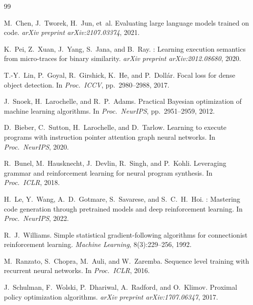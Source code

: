 \documentclass{article}
\begin{document}

\begin{thebibliography}{99}

M.~Chen, J.~Tworek, H.~Jun, et~al.
\newblock Evaluating large language models trained on code.
\newblock \emph{arXiv preprint arXiv:2107.03374}, 2021.

K.~Pei, Z.~Xuan, J.~Yang, S.~Jana, and B.~Ray.
: Learning execution semantics from micro-traces for binary
  similarity.
\newblock \emph{arXiv preprint arXiv:2012.08680}, 2020.

T.-Y.~Lin, P.~Goyal, R.~Girshick, K.~He, and P.~Doll{\'a}r.
\newblock Focal loss for dense object detection.
\newblock In \emph{Proc.\ ICCV}, pp.~2980--2988, 2017.

J.~Snoek, H.~Larochelle, and R.~P.~Adams.
\newblock Practical {B}ayesian optimization of machine learning algorithms.
\newblock In \emph{Proc.\ NeurIPS}, pp.~2951--2959, 2012.

D.~Bieber, C.~Sutton, H.~Larochelle, and D.~Tarlow.
\newblock Learning to execute programs with instruction pointer attention graph
  neural networks.
\newblock In \emph{Proc.\ NeurIPS}, 2020.

R.~Bunel, M.~Hausknecht, J.~Devlin, R.~Singh, and P.~Kohli.
\newblock Leveraging grammar and reinforcement learning for neural program
  synthesis.
\newblock In \emph{Proc.\ ICLR}, 2018.

H.~Le, Y.~Wang, A.~D.~Gotmare, S.~Savarese, and S.~C.~H.~Hoi.
: Mastering code generation through pretrained models and deep
  reinforcement learning.
\newblock In \emph{Proc.\ NeurIPS}, 2022.

R.~J.~Williams.
\newblock Simple statistical gradient-following algorithms for connectionist
  reinforcement learning.
\newblock \emph{Machine Learning}, 8(3):229--256, 1992.

M.~Ranzato, S.~Chopra, M.~Auli, and W.~Zaremba.
\newblock Sequence level training with recurrent neural networks.
\newblock In \emph{Proc.\ ICLR}, 2016.

J.~Schulman, F.~Wolski, P.~Dhariwal, A.~Radford, and O.~Klimov.
\newblock Proximal policy optimization algorithms.
\newblock \emph{arXiv preprint arXiv:1707.06347}, 2017.


\end{thebibliography}
\end{document}
